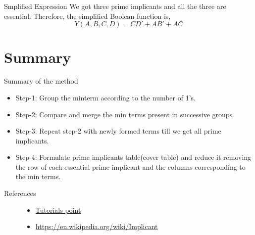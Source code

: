 \documentclass{beamer}
\begin{document}
\begin{frame}{Smplified Expression}
    We got three prime implicants and all the three are essential. Therefore, the simplified Boolean function is,
    \begin{equation*}
        Y(A,B,C,D) = CD' + AB' + AC
    \end{equation*}
\end{frame}

\section{Summary}
\begin{frame}{Summary of the method}
    \begin{itemize}
        \item Step-1: Group the minterm according to the number of 1’s. \pause
        \item Step-2: Compare and merge the min terms present in successive groups. \pause
        \item Step-3: Repeat step-2 with newly formed terms till we get all prime implicants. \pause
        \item Step-4: Formulate prime implicants table(cover table) and reduce it removing the row of each essential prime implicant and the columns corresponding to the min terms.
    \end{itemize}
\end{frame}{}

\begin{frame}{References} 
\begin{figure}
    \begin{itemize}
        \item \href{https://www.tutorialspoint.com/digital_circuits/digital_circuits_quine_mccluskey_tabular_method.htm}{Tutorials point}
        \item \href{https://en.wikipedia.org/wiki/Implicant}{https://en.wikipedia.org/wiki/Implicant}
    \end{itemize}
\end{figure}{}
\end{frame}{}
\end{document}
